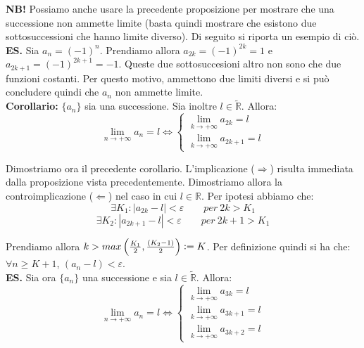 \documentclass{article}
\begin{document}
\noindent\textbf{NB!} Possiamo anche usare la precedente proposizione per mostrare che una successione non ammette limite (basta quindi mostrare che esistono due sottosuccessioni che hanno limite diverso). Di seguito si riporta un esempio di ciò. \\

\noindent\textbf{ES.} Sia $a_n = (-1)^n$. Prendiamo allora $a_{2k} = (-1)^{2k} = 1$ e $a_{2k + 1} = (-1)^{2k + 1} = -1$. Queste due sottosuccesioni altro non sono che due funzioni costanti. Per questo motivo, ammettono due limiti diversi e si può concludere quindi che $a_n$ non ammette limite. \\

\noindent\textbf{Corollario:} $\{a_n\}$ sia una successione. Sia inoltre $l \in \widetilde{\mathbb{R}}$. Allora:
\begin{equation*}
    \lim_{n \to +\infty} a_n = l \iff \begin{cases}
        \lim_{k \to +\infty} a_{2k} = l \\
        \lim_{k \to +\infty} a_{2k + 1} = l
    \end{cases}
\end{equation*}

\noindent Dimostriamo ora il precedente corollario. L'implicazione ($\Rightarrow$) risulta immediata dalla proposizione vista precedentemente. Dimostriamo allora la controimplicazione ($\Leftarrow$) nel caso in cui $l \in \mathbb{R}$. Per ipotesi abbiamo che:
\begin{equation*}
    \exists K_1 : |a_{2k} - l| < \varepsilon \qquad per \ 2k > K_1
\end{equation*}
\begin{equation*}
    \exists K_2 : |a_{2k + 1} - l| < \varepsilon \qquad per \ 2k + 1 > K_1
\end{equation*}

\noindent Prendiamo allora $k > max\left(\frac{K_1}{2}, \frac{(K_2 - 1)}{2}\right) \vcentcolon = K$. Per definizione quindi si ha che: $\forall n \geq K + 1$, $(a_n - l) < \varepsilon$.\\

\noindent\textbf{ES.} Sia ora $\{a_n\}$ una successione e sia $l \in \widetilde{\mathbb{R}}$. Allora:
\begin{equation*}
    \lim_{n \to +\infty} a_n = l \iff \begin{cases}
        \lim_{k \to +\infty} a_{3k} = l \\
        \lim_{k \to +\infty} a_{3k + 1} = l \\
        \lim_{k \to +\infty} a_{3k + 2} = l
    \end{cases}
\end{equation*}
\end{document}
